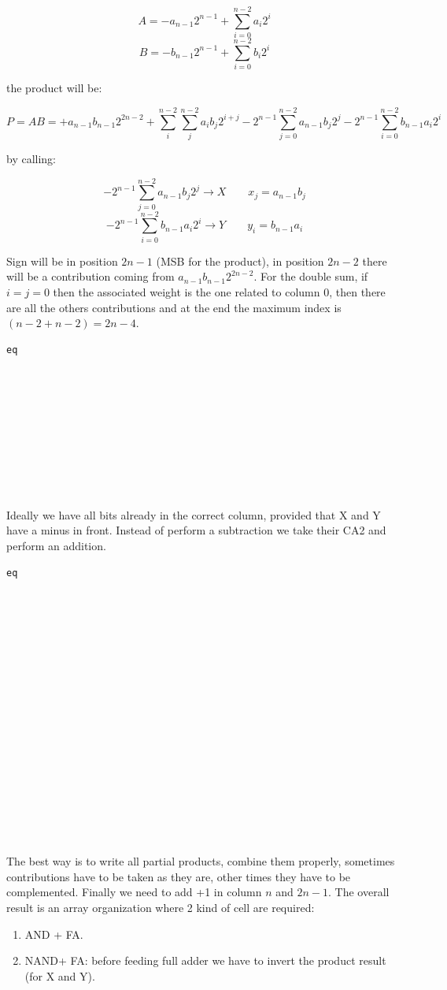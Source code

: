 $$A=-a_{n-1}2^{n-1}+\sum_{i=0}^{n-2}a_i2^i$$
$$B=-b_{n-1}2^{n-1}+\sum_{i=0}^{n-2}b_i2^i$$

the product will be:

$$P=AB=+a_{n-1}b_{n-1}2^{2n-2}+ \sum_{i}^{n-2} \sum_{j}^{n-2}a_ib_j2^{i+j}-2^{n-1} \sum_{j=0}^{n-2}a_{n-1}b_j2^j - 2^{n-1} \sum_{i=0}^{n-2}b_{n-1}a_i2^i$$

by calling:

$$-2^{n-1} \sum_{j=0}^{n-2}a_{n-1}b_j2^j \rightarrow X  \qquad x_j=a_{n-1}b_j$$
$$- 2^{n-1} \sum_{i=0}^{n-2}b_{n-1}a_i2^i \rightarrow Y \qquad y_i=b_{n-1}a_i$$

Sign will be in position $2n-1$ (MSB for the product), in position $2n-2$ there will be a contribution coming from $a_{n-1}b_{n-1}2^{2n-2}$. For the double sum, if $i=j=0$ then the associated weight is the one related to column 0, then there are all the others contributions and at the end the maximum index is $(n-2+n-2)=2n-4$.

\begin{verbatim}
eq










\end{verbatim}

Ideally we have all bits already in the correct column, provided that X and Y have a minus in front. Instead of perform a subtraction we take their CA2 and perform an addition.

\begin{verbatim}
eq


















\end{verbatim}
The best way is to write all partial products, combine them properly, sometimes contributions have to be taken as they are, other times they have to be complemented. Finally we need to add +1 in column $n$ and $2n-1$. The overall result is an array organization where 2 kind of cell are required:
\begin{enumerate}
  \item AND + FA.
  \item NAND+ FA: before feeding full adder we have to invert the product result (for X and Y).
\end{enumerate}

